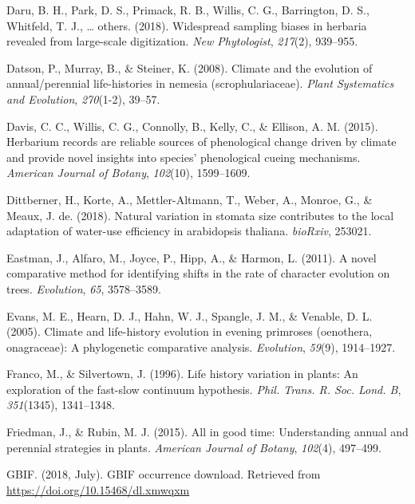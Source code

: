 \documentclass[man,floatsintext]{apa6}
\theoremstyle{definition}
\theoremstyle{definition}
\theoremstyle{definition}
\theoremstyle{remark}
\begin{document}
\leavevmode\hypertarget{ref-daru2018widespread}{}%
Daru, B. H., Park, D. S., Primack, R. B., Willis, C. G., Barrington, D.
S., Whitfeld, T. J., \ldots{} others. (2018). Widespread sampling biases
in herbaria revealed from large-scale digitization. \emph{New
Phytologist}, \emph{217}(2), 939--955.

\leavevmode\hypertarget{ref-datson2008climate}{}%
Datson, P., Murray, B., \& Steiner, K. (2008). Climate and the evolution
of annual/perennial life-histories in nemesia (scrophulariaceae).
\emph{Plant Systematics and Evolution}, \emph{270}(1-2), 39--57.

\leavevmode\hypertarget{ref-davis2015herbarium}{}%
Davis, C. C., Willis, C. G., Connolly, B., Kelly, C., \& Ellison, A. M.
(2015). Herbarium records are reliable sources of phenological change
driven by climate and provide novel insights into species' phenological
cueing mechanisms. \emph{American Journal of Botany}, \emph{102}(10),
1599--1609.

\leavevmode\hypertarget{ref-dittberner2018natural}{}%
Dittberner, H., Korte, A., Mettler-Altmann, T., Weber, A., Monroe, G.,
\& Meaux, J. de. (2018). Natural variation in stomata size contributes
to the local adaptation of water-use efficiency in arabidopsis thaliana.
\emph{bioRxiv}, 253021.

\leavevmode\hypertarget{ref-R-geiger_b}{}%
Eastman, J., Alfaro, M., Joyce, P., Hipp, A., \& Harmon, L. (2011). A
novel comparative method for identifying shifts in the rate of character
evolution on trees. \emph{Evolution}, \emph{65}, 3578--3589.

\leavevmode\hypertarget{ref-evans2005climate}{}%
Evans, M. E., Hearn, D. J., Hahn, W. J., Spangle, J. M., \& Venable, D.
L. (2005). Climate and life-history evolution in evening primroses
(oenothera, onagraceae): A phylogenetic comparative analysis.
\emph{Evolution}, \emph{59}(9), 1914--1927.

\leavevmode\hypertarget{ref-franco1996life}{}%
Franco, M., \& Silvertown, J. (1996). Life history variation in plants:
An exploration of the fast-slow continuum hypothesis. \emph{Phil. Trans.
R. Soc. Lond. B}, \emph{351}(1345), 1341--1348.

\leavevmode\hypertarget{ref-friedman2015all}{}%
Friedman, J., \& Rubin, M. J. (2015). All in good time: Understanding
annual and perennial strategies in plants. \emph{American Journal of
Botany}, \emph{102}(4), 497--499.

\leavevmode\hypertarget{ref-gbifdownload}{}%
GBIF. (2018, July). GBIF occurrence download. Retrieved from
\url{https://doi.org/10.15468/dl.xmwqxm}
\end{document}

